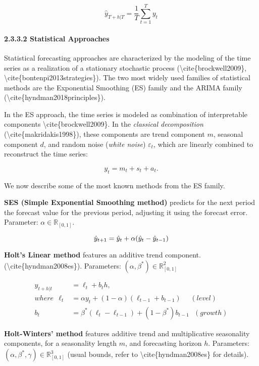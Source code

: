\documentclass[
]{article}
\begin{document}
\[\hat{y}_{T+h|T} = \frac{1}{T}\sum_{t=1}^Ty_t\]

\hypertarget{header-n122}{%
\paragraph{2.3.3.2 Statistical Approaches}\label{header-n122}}

Statistical forecasting approaches are characterized by the modeling of
the time series as a realization of a stationary stochastic process
(\textbackslash cite\{brockwell2009\},
\textbackslash cite\{bontenpi2013strategies\}). The two most widely used
families of statistical methods are the Exponential Smoothing (ES)
family and the ARIMA family
(\textbackslash cite\{hyndman2018principles\}).

In the ES approach, the time series is modeled as combination of
interpretable components \textbackslash cite\{brockwell2009\}. In the
\emph{classical decomposition} (\textbackslash cite\{makridakis1998\}),
these components are trend component \(m\), seasonal component \(d\),
and random noise (\emph{white noise}) \(\varepsilon_t\), which are
linearly combined to reconstruct the time series:

\[y_t = m_t + s_t + a_t .\]

We now describe some of the most known methods from the ES family.

\textbf{SES (Simple Exponential Smoothing method)} predicts for the next
period the forecast value for the previous period, adjusting it using
the forecast error. Parameter: \(\alpha \in \mathbb{R}_{[0,1]}\).

\[\hat{y}_{t+1} = \hat{y}_{t} + \alpha(\hat{y}_{t} - \hat{y}_{t-1}) \\\]

\textbf{Holt's Linear method} features an additive trend component.
(\textbackslash cite\{hyndman2008es\}). Parameters:
\((\alpha, \beta^*) \in \mathbb{R}^2_{[0,1]}\)

\begin{align}
\hat{y}_{t+h|t} &= \ell_t + b_th, \\
where\ \  \ell_t &= \alpha y_t + (1-\alpha)(\ell_{t-1}+b_{t-1}) \ \ \ \ \ \ (level) \\
b_t &= \beta^*(\ell_t - \ell_{t-1}) + (1-\beta^*)b_{t-1} \ \ \ (growth)
\end{align}

\textbf{Holt-Winters' method} features additive trend and multiplicative
seasonality components, for a seasonality length \(m\), and forecasting
horizon \(h\). Parameters:
\((\alpha, \beta^*,\gamma) \in \mathbb{R}^3_{[0,1]}\) (usual bounds,
refer to \textbackslash cite\{hyndman2008es\} for details).
\end{document}
